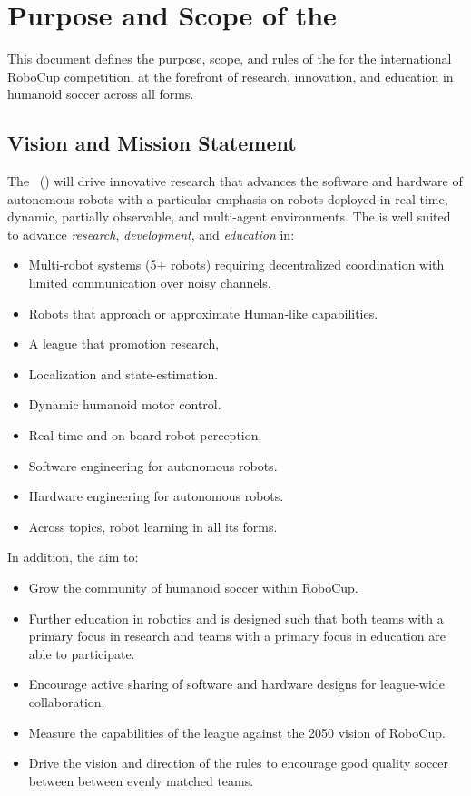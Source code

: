 \section{Purpose and Scope of the \leaguename}
\label{sec:introduction}

This document defines the purpose, scope, and rules of the \leaguename for the international RoboCup competition, at the forefront of research, innovation, and education in humanoid soccer across all forms.

\subsection{Vision and Mission Statement}
\label{sec:vision_and_mission}

The \leaguename~(\leaguenameabbr) will drive innovative research that advances the software and hardware of autonomous robots with a particular emphasis on robots deployed in real-time, dynamic, partially observable, and multi-agent environments.
The \leaguenameabbr is well suited to advance \textit{research}, \textit{development}, and \textit{education} in:
\begin{itemize}
    \item Multi-robot systems (5+ robots) requiring decentralized coordination with limited communication over noisy channels.
    \item Robots that approach or approximate Human-like capabilities.
    \item A league that promotion research, 
    \item Localization and state-estimation.
    \item Dynamic humanoid motor control.
    \item Real-time and on-board robot perception.
    \item Software engineering for autonomous robots.
    \item Hardware engineering for autonomous robots.
    \item Across topics, robot learning in all its forms.
\end{itemize}

In addition, the \leaguenameabbr aim to:
\begin{itemize}
    \item Grow the community of humanoid soccer within RoboCup.
    \item Further education in robotics and is designed such that both teams with a primary focus in research and teams with a primary focus in education are able to participate.
    \item Encourage active sharing of software and hardware designs for league-wide collaboration.
    \item Measure the capabilities of the league against the 2050 vision of RoboCup.
    \item Drive the vision and direction of the rules to encourage good quality soccer between between evenly matched teams.
\end{itemize}

